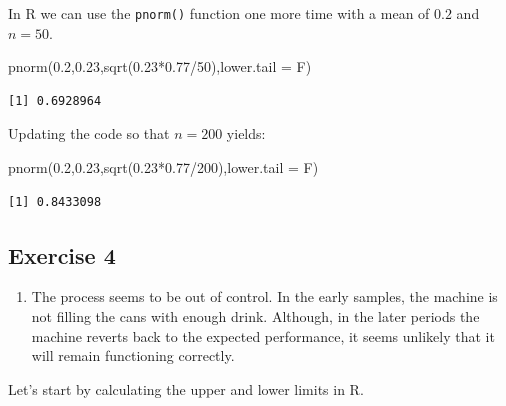 \documentclass[
  letterpaper,
  DIV=11,
  numbers=noendperiod]{scrreprt}
\newenvironment{Shaded}{\begin{snugshade}}{\end{snugshade}}
\newcommand{\AttributeTok}[1]{\textcolor[rgb]{0.40,0.45,0.13}{#1}}
\newcommand{\DecValTok}[1]{\textcolor[rgb]{0.68,0.00,0.00}{#1}}
\newcommand{\FloatTok}[1]{\textcolor[rgb]{0.68,0.00,0.00}{#1}}
\newcommand{\FunctionTok}[1]{\textcolor[rgb]{0.28,0.35,0.67}{#1}}
\newcommand{\NormalTok}[1]{\textcolor[rgb]{0.00,0.23,0.31}{#1}}
\newcommand{\SpecialCharTok}[1]{\textcolor[rgb]{0.37,0.37,0.37}{#1}}
\providecommand{\tightlist}{%
  \setlength{\itemsep}{0pt}\setlength{\parskip}{0pt}}\usepackage{longtable,booktabs,array}
\begin{document}
In R we can use the \texttt{pnorm()} function one more time with a mean
of \(0.2\) and \(n=50\).

\begin{Shaded}
\begin{Highlighting}[numbers=left,,]
\FunctionTok{pnorm}\NormalTok{(}\FloatTok{0.2}\NormalTok{,}\FloatTok{0.23}\NormalTok{,}\FunctionTok{sqrt}\NormalTok{(}\FloatTok{0.23}\SpecialCharTok{*}\FloatTok{0.77}\SpecialCharTok{/}\DecValTok{50}\NormalTok{),}\AttributeTok{lower.tail =}\NormalTok{ F)}
\end{Highlighting}
\end{Shaded}

\begin{verbatim}
[1] 0.6928964
\end{verbatim}

Updating the code so that \(n=200\) yields:

\begin{Shaded}
\begin{Highlighting}[numbers=left,,]
\FunctionTok{pnorm}\NormalTok{(}\FloatTok{0.2}\NormalTok{,}\FloatTok{0.23}\NormalTok{,}\FunctionTok{sqrt}\NormalTok{(}\FloatTok{0.23}\SpecialCharTok{*}\FloatTok{0.77}\SpecialCharTok{/}\DecValTok{200}\NormalTok{),}\AttributeTok{lower.tail =}\NormalTok{ F)}
\end{Highlighting}
\end{Shaded}

\begin{verbatim}
[1] 0.8433098
\end{verbatim}

\hypertarget{exercise-4-11}{%
\subsection*{Exercise 4}\label{exercise-4-11}}

\begin{enumerate}
\def\labelenumi{\arabic{enumi}.}
\tightlist
\item
  The process seems to be out of control. In the early samples, the
  machine is not filling the cans with enough drink. Although, in the
  later periods the machine reverts back to the expected performance, it
  seems unlikely that it will remain functioning correctly.
\end{enumerate}

Let's start by calculating the upper and lower limits in R.
\end{document}
